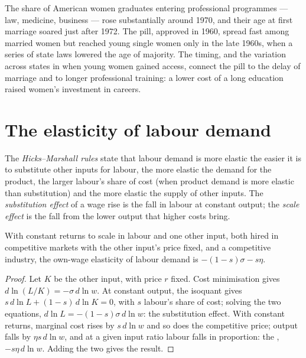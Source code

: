 \begin{record}
The share of American women graduates entering professional programmes ---
law, medicine, business --- rose substantially around 1970, and their age at first
marriage soared just after 1972. The pill, approved in 1960, spread fast among married
women but reached young single women only in the late 1960s, when a series of state
laws lowered the age of majority. The timing, and the variation across states in
when young women gained access, connect the pill to the delay of marriage and to
longer professional training: a lower cost of a long education raised women's
investment in careers. %
\end{record}

\section{The elasticity of labour demand}\label{sec:b3:labour-supply-and-demand:demand}

\begin{definition}\label{def:b3:labour-supply-and-demand:hicks-marshall}
The \emph{Hicks--Marshall rules} state that labour demand is more elastic the easier
it is to substitute other inputs for labour, the more elastic the demand for the
product, the larger labour's share of cost (when product demand is more elastic
than substitution) and the more elastic the supply of other inputs. The
\emph{substitution effect} of a wage rise is the fall in labour at constant output;
the \emph{scale effect} is the fall from the lower output that higher costs bring.
\end{definition}

\begin{proposition}\label{prop:b3:labour-supply-and-demand:hm}
With constant returns to scale in labour and one other input, both hired in
competitive markets with the other input's price fixed, and a competitive industry,
the own-wage elasticity of labour demand is $-(1 - s)\sigma - s\eta$.
\end{proposition}

\begin{proof}
Let $K$ be the other input, with price $r$ fixed. Cost minimisation gives $d\ln(L/K) = -\sigma\, d\ln w$. At
constant output, the isoquant gives $s\,d\ln L + (1 - s)\,d\ln K = 0$, with $s$ labour's share of cost;
solving the two equations, $d\ln L = -(1 - s)\sigma\, d\ln w$: the substitution effect. With constant
returns, marginal cost rises by $s\,d\ln w$ and so does the competitive price; output falls
by $\eta s\,d\ln w$, and at a given input ratio labour falls in proportion: the ,
$-s\eta\, d\ln w$. Adding the two gives the result.
\end{proof}

